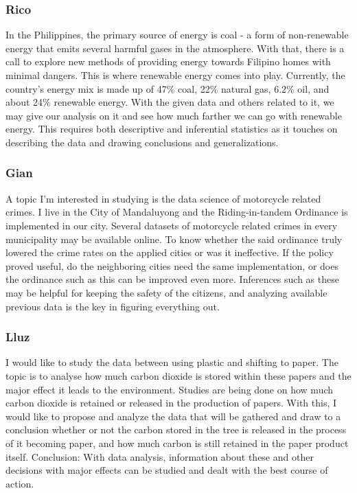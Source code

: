 \documentclass[
]{article}
\begin{document}
\hypertarget{rico-2}{%
\subsubsection{Rico}\label{rico-2}}

In the Philippines, the primary source of energy is coal - a form of
non-renewable energy that emits several harmful gases in the atmosphere.
With that, there is a call to explore new methods of providing energy
towards Filipino homes with minimal dangers. This is where renewable
energy comes into play. Currently, the country's energy mix is made up
of 47\% coal, 22\% natural gas, 6.2\% oil, and about 24\% renewable
energy. With the given data and others related to it, we may give our
analysis on it and see how much farther we can go with renewable energy.
This requires both descriptive and inferential statistics as it touches
on describing the data and drawing conclusions and generalizations.

\hypertarget{gian-2}{%
\subsubsection{Gian}\label{gian-2}}

A topic I'm interested in studying is the data science of motorcycle
related crimes. I live in the City of Mandaluyong and the
Riding-in-tandem Ordinance is implemented in our city. Several datasets
of motorcycle related crimes in every municipality may be available
online. To know whether the said ordinance truly lowered the crime rates
on the applied cities or was it ineffective. If the policy proved
useful, do the neighboring cities need the same implementation, or does
the ordinance such as this can be improved even more. Inferences such as
these may be helpful for keeping the safety of the citizens, and
analyzing available previous data is the key in figuring everything out.

\hypertarget{lluz-2}{%
\subsubsection{Lluz}\label{lluz-2}}

I would like to study the data between using plastic and shifting to
paper. The topic is to analyse how much carbon dioxide is stored within
these papers and the major effect it leads to the environment. Studies
are being done on how much carbon dioxide is retained or released in the
production of papers. With this, I would like to propose and analyze the
data that will be gathered and draw to a conclusion whether or not the
carbon stored in the tree is released in the process of it becoming
paper, and how much carbon is still retained in the paper product
itself. Conclusion: With data analysis, information about these and
other decisions with major effects can be studied and dealt with the
best course of action.
\end{document}
